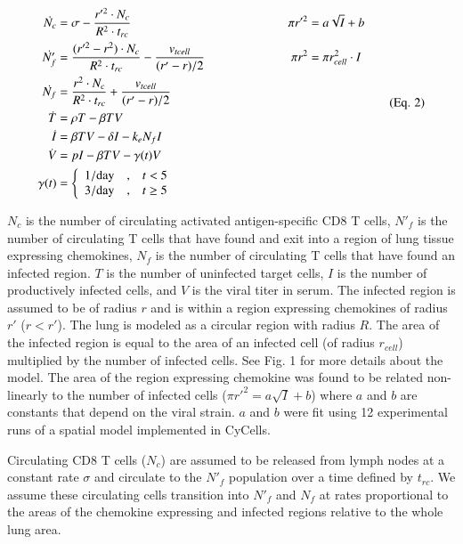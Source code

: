 \documentclass[preprint,10pt,authoryear]{elsarticle}
\begin{document}
{\footnotesize
\begin{equation*}
\label{eq:miao}
\begin{aligned}
\dot{N_{c}} &= \sigma - \frac{r'^{2} \cdot N_{c}}{R^{2} \cdot t_{rc}} & \pi r'^{2} &= a \sqrt{I} + b \\
\dot{N'_{f}} &= \frac{(r'^{2} - r^{2}) \cdot N_{c}}{R^{2} \cdot t_{rc}} - \frac{v_{tcell}}{(r' - r) / 2} \hspace*{2cm}  & \pi r^{2} &= \pi r_{cell}^{2} \cdot I \\
\dot{N_{f}} &= \frac{r^{2} \cdot N_{c}}{R^{2} \cdot t_{rc}} + \frac{v_{tcell}}{(r' - r) / 2} \\
\dot{T} &= \rho T -\beta TV \\
\dot{I} &= \beta TV - \delta I - k_{e} N_{f} I \\
\dot{V} &= pI - \beta TV - \gamma (t) V \\
\gamma (t) &= \left\{ \begin{array}{rcl}
	1/\mbox{day} & \mbox{,}  & t < 5  \\
	3/\mbox{day} & \mbox{,} & t \geq 5  
	\end{array}\right. \\
\end{aligned}
\tag{Eq. 2}
\end{equation*}
}
\vspace{0.5in}


$N_{c}$ is the number of circulating activated antigen-specific CD8 T cells, $N'_{f}$ is the number of circulating T cells that have found and exit into a region of lung tissue expressing chemokines, $N_{f}$ is the number of circulating T cells that have found an infected region. $T$ is the number of uninfected target cells, $I$ is the number of productively infected cells, and $V$ is the viral titer in serum. The infected region is assumed to be of radius $r$ and is within a region expressing chemokines of radius $r'$ ($r  < r'$). The lung is modeled as a circular region with radius $R$. The area of the infected region is equal to the area of an infected cell (of radius $r_{cell}$) multiplied by the number of infected cells. See Fig. 1 for more details about the model.  The area of the region expressing chemokine was found to be related non-linearly to the number of infected cells ($\pi r'^{2} = a \sqrt{I} + b$) where $a$ and $b$ are constants that depend on the viral strain.  $a$ and $b$ were fit using 12 experimental runs of a spatial model implemented in CyCells.

Circulating CD8 T cells ($N_{c}$) are assumed to be released from lymph nodes at a constant rate $\sigma$ and circulate to the $N'_{f}$ population over a time defined by $t_{rc}$. We assume these circulating cells transition into $N'_{f}$ and $N_{f}$ at rates proportional to the areas of the chemokine expressing and infected regions relative to the whole lung area. 
\end{document}
